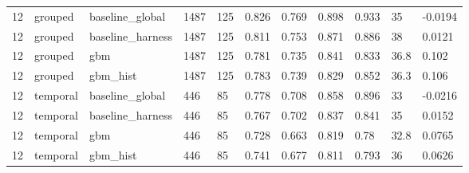 \begin{tabular}{lllllllllll}
12 & grouped & baseline\_global & 1487 & 125 & 0.826 & 0.769 & 0.898 & 0.933 & 35 & -0.0194 \\
12 & grouped & baseline\_harness & 1487 & 125 & 0.811 & 0.753 & 0.871 & 0.886 & 38 & 0.0121 \\
12 & grouped & gbm & 1487 & 125 & 0.781 & 0.735 & 0.841 & 0.833 & 36.8 & 0.102 \\
12 & grouped & gbm\_hist & 1487 & 125 & 0.783 & 0.739 & 0.829 & 0.852 & 36.3 & 0.106 \\
12 & temporal & baseline\_global & 446 & 85 & 0.778 & 0.708 & 0.858 & 0.896 & 33 & -0.0216 \\
12 & temporal & baseline\_harness & 446 & 85 & 0.767 & 0.702 & 0.837 & 0.841 & 35 & 0.0152 \\
12 & temporal & gbm & 446 & 85 & 0.728 & 0.663 & 0.819 & 0.78 & 32.8 & 0.0765 \\
12 & temporal & gbm\_hist & 446 & 85 & 0.741 & 0.677 & 0.811 & 0.793 & 36 & 0.0626 \\
\bottomrule
\end{tabular}